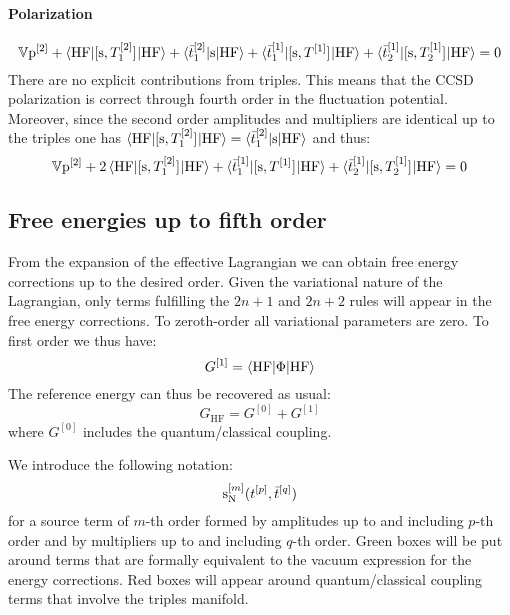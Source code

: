\paragraph*{Polarization}
\begin{equation}
  \mathbb{V}\mathrm{p}^{[2]} +
  \braket{\mathrm{HF} | [ \mathrm{s}, T_1^{[2]} ]^{}| \mathrm{HF}}
  + \braket{\bar{t}_{1}^{[2]} | \mathrm{s} | \mathrm{HF} }
  + \braket{\bar{t}_{1}^{[1]} | [ \mathrm{s}, T^{[1]} ]^{} | \mathrm{HF}}
  + \braket{\bar{t}_{2}^{[1]} | [ \mathrm{s}, T_2^{[1]} ]^{} | \mathrm{HF}}
  = 0
\end{equation}
There are no explicit contributions from triples. This means that the
\acrshort{CCSD} polarization is correct through fourth order in the
fluctuation potential.
Moreover, since the second order amplitudes and multipliers are
identical up to the triples one has $\braket{\mathrm{HF} | [ \mathrm{s}, T_1^{[2]} ]^{}| \mathrm{HF}} = \braket{\bar{t}_{1}^{[2]} | \mathrm{s} | \mathrm{HF} }$
and thus:
\begin{equation}\label{eq:2nd-order-pol}
  \mathbb{V}\mathrm{p}^{[2]} +
  2\braket{\mathrm{HF} | [ \mathrm{s}, T_1^{[2]} ]^{}| \mathrm{HF}}
  + \braket{\bar{t}_{1}^{[1]} | [ \mathrm{s}, T^{[1]} ]^{} | \mathrm{HF}}
  + \braket{\bar{t}_{2}^{[1]} | [ \mathrm{s}, T_2^{[1]} ]^{} | \mathrm{HF}}
  = 0
\end{equation}

\subsection{Free energies up to fifth order}\label{sec:energies-pt}

From the expansion of the effective Lagrangian we can obtain free energy
corrections up to the desired order. Given the variational nature of the
Lagrangian, only terms fulfilling the $2n+1$ and $2n+2$ rules will
appear in the free energy corrections.
To zeroth-order all variational parameters are zero. To first order we
thus have:
\begin{equation}\label{eq:first-order-G}
  G^{[1]} = \braket{\mathrm{HF} | \Phi | \mathrm{HF}}
\end{equation}
The reference energy can thus be recovered as usual:
\begin{equation}
  G_\mathrm{HF} = G^{[0]} + G^{[1]}
\end{equation}
where $G^{[0]}$ includes the quantum/classical coupling.

We introduce the following notation:
\begin{equation}
  \mathrm{s}_{\mathrm{N}}^{[m]}(t_{}^{[p]}, \bar{t}_{}^{[q]})
\end{equation}
for a source term of $m$-th order formed by amplitudes up to and
including $p$-th order and by multipliers up to and including $q$-th order.
Green boxes will be put around terms that are formally equivalent to the
vacuum expression for the energy corrections. Red boxes will appear
around quantum/classical coupling terms that involve the triples
manifold.

